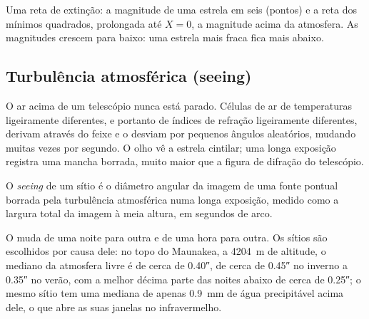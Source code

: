 \begin{omfigure}

{\small Uma reta de extinção: a magnitude de uma estrela em seis  (pontos) e a reta dos mínimos quadrados, prolongada até $X = 0$, a magnitude acima da atmosfera. As magnitudes crescem para baixo: uma estrela mais fraca fica mais abaixo.}
\end{omfigure}

\subsection*{Turbulência atmosférica (seeing)}

O ar acima de um telescópio nunca está parado. Células de ar de temperaturas ligeiramente diferentes, e portanto de índices de refração ligeiramente diferentes, derivam através do feixe e o desviam por pequenos ângulos aleatórios, mudando muitas vezes por segundo. O olho vê a estrela cintilar; uma longa exposição registra uma mancha borrada, muito maior que a figura de difração do telescópio.

\begin{definition}\label{def:b1:observing-the-sky:seeing}
O \emph{seeing} de um sítio é o diâmetro angular da imagem de uma fonte pontual borrada pela turbulência atmosférica numa longa exposição, medido como a largura total da imagem à meia altura, em segundos de arco.
\end{definition}

O  muda de uma noite para outra e de uma hora para outra. Os sítios são escolhidos por causa dele: no topo do Maunakea, a \qty{4204}{m} de altitude, o  mediano da atmosfera livre é de cerca de \ang{;;0.40}, de cerca de \ang{;;0.45} no inverno a \ang{;;0.35} no verão, com a melhor décima parte das noites abaixo de cerca de \ang{;;0.25}; o mesmo sítio tem uma mediana de apenas \qty{0.9}{mm} de água precipitável acima dele, o que abre as suas janelas no infravermelho.

